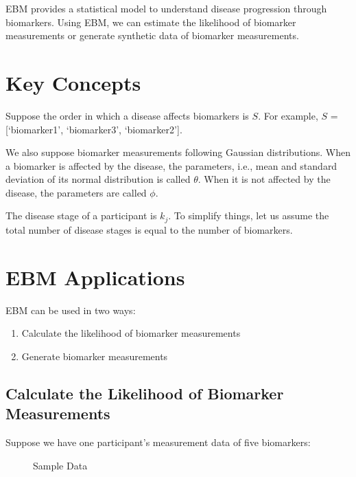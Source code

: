 \documentclass[
  letterpaper,
  DIV=11,
  numbers=noendperiod]{scrreprt}
\providecommand{\tightlist}{%
  \setlength{\itemsep}{0pt}\setlength{\parskip}{0pt}}\usepackage{longtable,booktabs,array}
\begin{document}
EBM provides a statistical model to understand disease progression
through biomarkers. Using EBM, we can estimate the likelihood of
biomarker measurements or generate synthetic data of biomarker
measurements.

\section{Key Concepts}\label{key-concepts}

Suppose the order in which a disease affects biomarkers is \(S\). For
example, \(S\) = {[}`biomarker1', `biomarker3', `biomarker2'{]}.

We also suppose biomarker measurements following Gaussian distributions.
When a biomarker is affected by the disease, the parameters, i.e., mean
and standard deviation of its normal distribution is called \(\theta\).
When it is not affected by the disease, the parameters are called
\(\phi\).

The disease stage of a participant is \(k_j\). To simplify things, let
us assume the total number of disease stages is equal to the number of
biomarkers.

\section{EBM Applications}\label{ebm-applications}

EBM can be used in two ways:

\begin{enumerate}
\def\labelenumi{\arabic{enumi}.}
\tightlist
\item
  Calculate the likelihood of biomarker measurements
\item
  Generate biomarker measurements
\end{enumerate}

\subsection{Calculate the Likelihood of Biomarker
Measurements}\label{sec-calc-ll}

Suppose we have one participant's measurement data of five biomarkers:

\begin{figure}


\caption{\label{fig-sample-data}Sample Data}

\end{figure}%
\end{document}
